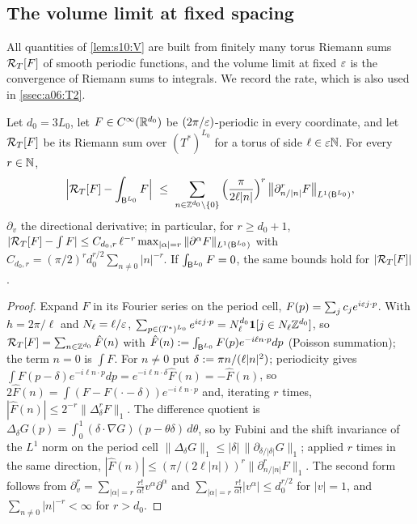 
\subsection{The volume limit at fixed spacing}\label{ssec:a06:V}

All quantities of \cref{lem:s10:V} are built from finitely many torus Riemann sums $\mathcal R_{T}[F]$ of smooth periodic functions, and the volume limit at fixed $\varepsilon$ is the convergence of Riemann sums to integrals. We record the rate, which is also used in \cref{ssec:a06:T2}.

\begin{lemma}\label{lem:a06:RS}
Let $d_0=3L_0$, let $F\in C^\infty(\mathbb R^{d_0})$ be $(2\pi/\varepsilon)$-periodic in every coordinate, and let $\mathcal R_{T}[F]$ be its Riemann sum over $(T^*)^{L_0}$ for a torus of side $\ell\in\varepsilon\mathbb N$. For every $r\in\mathbb N$,
\[
\Big|\RT F-\int_{\BZ^{L_0}}F\Big|\ \le\ \sum_{n\in\Z^{d_0}\setminus\{0\}}\Big(\frac{\pi}{2\ell|n|}\Big)^r\,\big\|\partial^r_{n/|n|}F\big\|_{L^1(\BZ^{L_0})},
\]
$\partial_v$ the directional derivative; in particular, for $r\ge d_0+1$, $|\mathcal R_{T}[F]-\int F|\le C_{d_0,r}\,\ell^{-r}\max_{|\alpha|=r}\|\partial^\alpha F\|_{L^1(\mathsf B^{L_0})}$ with $C_{d_0,r}=(\pi/2)^rd_0^{r/2}\sum_{n\ne0}|n|^{-r}$. If $\int_{\mathsf B^{L_0}}F=0$, the same bounds hold for $|\mathcal R_{T}[F]|$.
\end{lemma}

\begin{proof}
Expand $F$ in its Fourier series on the period cell, $F(p)=\sum_{j}c_je^{i\varepsilon j\cdot p}$. With $h=2\pi/\ell$ and $N_\ell=\ell/\varepsilon$, $\sum_{p\in(T^*)^{L_0}}e^{i\varepsilon j\cdot p}=N_\ell^{d_0}\mathbf 1[j\in N_\ell\mathbb Z^{d_0}]$, so $\mathcal R_{T}[F]=\sum_{n\in\mathbb Z^{d_0}}\hat F(n)$ with $\hat F(n):=\int_{\mathsf B^{L_0}}F(p)e^{-i\ell n\cdot p}dp$ (Poisson summation); the term $n=0$ is $\int F$. For $n\ne0$ put $\delta:=\pi n/(\ell|n|^2)$; periodicity gives $\int F(p-\delta)e^{-i\ell n\cdot p}dp=e^{-i\ell n\cdot\delta}\hat F(n)=-\hat F(n)$, so $2\hat F(n)=\int(F-F(\cdot-\delta))e^{-i\ell n\cdot p}$ and, iterating $r$ times, $|\hat F(n)|\le2^{-r}\|\Delta^r_\delta F\|_1$. The difference quotient is $\Delta_\delta G(p)=\int_0^1(\delta\cdot\nabla G)(p-\theta\delta)\,d\theta$, so by Fubini and the shift invariance of the $L^1$ norm on the period cell $\|\Delta_\delta G\|_1\le|\delta|\,\|\partial_{\delta/|\delta|}G\|_1$; applied $r$ times in the same direction, $|\hat F(n)|\le(\pi/(2\ell|n|))^r\|\partial^r_{n/|n|}F\|_1$. The second form follows from $\partial^r_v=\sum_{|\alpha|=r}\frac{r!}{\alpha!}v^\alpha\partial^\alpha$ and $\sum_{|\alpha|=r}\frac{r!}{\alpha!}|v^\alpha|\le d_0^{r/2}$ for $|v|=1$, and $\sum_{n\ne0}|n|^{-r}<\infty$ for $r>d_0$.
\end{proof}

